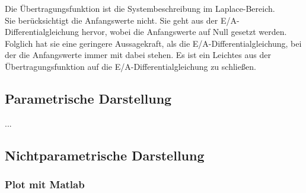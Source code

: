 Die Übertragungsfunktion ist die Systembeschreibung im Laplace-Bereich.\\
Sie berücksichtigt die Anfangswerte nicht. Sie geht aus der E/A-Differential\-gleichung hervor, wobei die Anfangswerte auf Null gesetzt werden. Folglich hat sie eine geringere Aussagekraft, als die E/A-Differentialgleichung, bei der die Anfangswerte immer mit dabei stehen. Es ist ein Leichtes aus der Übertragungsfunktion auf die E/A-Differentialgleichung zu schließen.
\subsection{Parametrische Darstellung} %



...
\subsection{Nichtparametrische Darstellung}
\subsubsection{Plot mit Matlab}
        

